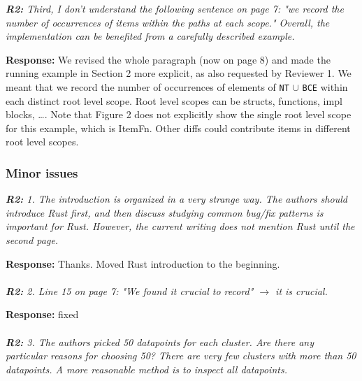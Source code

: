 \documentclass{article}
\begin{document}
\vspace*{1em} \noindent \textit{\textbf{R2:} Third, I don't understand the following sentence on page 7: "we record the number of occurrences of items within the paths at each scope." Overall, the implementation can be benefited from a carefully described example.}

\vspace*{1em} \noindent \textbf{Response:} We revised the whole paragraph (now on page 8) and made the running example in Section 2 more explicit, as also requested by Reviewer 1. We meant that we record the number of occurrences of elements of \verb+NT+ $\cup$ \verb+BCE+ within each distinct root level scope. Root level scopes can be structs, functions, impl blocks, …. Note that Figure 2 does not explicitly show the single root level scope for this example, which is ItemFn. Other diffs could contribute items in different root level scopes. \\

\subsubsection{\label{rev:2:minor}Minor issues}

\textit{\textbf{R2:} 1. The introduction is organized in a very strange way. The authors should introduce Rust first, and then discuss studying common bug/fix patterns is important for Rust. However, the current writing does not mention Rust until the second page.}

\vspace*{1em} \noindent \textbf{Response:} Thanks. Moved Rust introduction to the beginning. \\ \\

\vspace*{1em} \noindent \textit{\textbf{R2:} 2. Line 15 on page 7: "We found it crucial to record" $\rightarrow$ it is crucial.}

\vspace*{1em} \noindent \textbf{Response:} fixed \\ \\

\vspace*{1em} \noindent \textit{\textbf{R2:} 3. The authors picked 50 datapoints for each cluster. Are there any particular reasons for choosing 50? There are very few clusters with more than 50 datapoints. A more reasonable method is to inspect all datapoints.}
\end{document}
